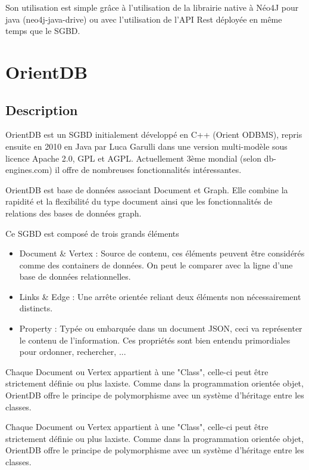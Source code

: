 \documentclass[a4paper,fleqn,12pt]{report}
\begin{document}
Son utilisation est simple grâce à l’utilisation de la librairie native à Néo4J pour java (neo4j-java-drive) ou avec l’utilisation de l’API Rest déployée en même temps que le SGBD.

\section{OrientDB}

\subsection{Description}

OrientDB est un SGBD initialement développé en C++ (Orient ODBMS), repris ensuite en 2010 en Java par Luca Garulli dans une version multi-modèle sous licence Apache 2.0, GPL et AGPL. Actuellement 3ème mondial (selon db-engines.com) il offre de nombreuses fonctionnalités intéressantes.

OrientDB est base de données associant Document et Graph. Elle combine la rapidité et la flexibilité du type document ainsi que les fonctionnalités de relations des bases de données graph.


Ce SGBD est composé de trois grands éléments 

\begin{itemize}
\item Document \& Vertex : Source de contenu, ces éléments peuvent être considérés comme des containers de données. On peut le comparer avec la ligne d'une base de données relationnelles.
\item Links \& Edge : Une arrête orientée reliant deux éléments non nécessairement distincts.
\item Property : Typée ou embarquée dans un document JSON, ceci va représenter le contenu de l'information. Ces propriétés sont bien entendu primordiales pour ordonner, rechercher, ...
\end{itemize}

Chaque Document ou Vertex appartient à une "Class", celle-ci peut être strictement définie ou plus laxiste. Comme dans la programmation orientée objet, OrientDB offre le principe de polymorphisme avec un système d'héritage entre les classes. 

Chaque Document ou Vertex appartient à une "Class", celle-ci peut être strictement définie ou plus laxiste. Comme dans la programmation orientée objet, OrientDB offre le principe de polymorphisme avec un système d’héritage entre les classes.
\end{document}
